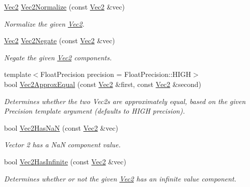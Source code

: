 \begin{DoxyCompactItemize}
\hyperlink{classgfxmath_1_1_vec2}{Vec2} \hyperlink{group___s_i_s_d_vec_math_gaa0125e18e221531bfc7d72d47cdf42d9}{Vec2\+Normalize} (const \hyperlink{classgfxmath_1_1_vec2}{Vec2} \&vec)
\begin{DoxyCompactList}\small\item\em Normalize the given \hyperlink{classgfxmath_1_1_vec2}{Vec2}. \end{DoxyCompactList}\item 
\hyperlink{classgfxmath_1_1_vec2}{Vec2} \hyperlink{group___s_i_s_d_vec_math_ga55959c707ef1b444eb2d71009a201aa2}{Vec2\+Negate} (const \hyperlink{classgfxmath_1_1_vec2}{Vec2} \&vec)
\begin{DoxyCompactList}\small\item\em Negate the given \hyperlink{classgfxmath_1_1_vec2}{Vec2} components. \end{DoxyCompactList}\item 
{\footnotesize template$<$Float\+Precision precision = Float\+Precision\+::\+H\+I\+G\+H$>$ }\\bool \hyperlink{group___s_i_s_d_vec_math_gae2e5df24e56917013fefa17579bb8749}{Vec2\+Approx\+Equal} (const \hyperlink{classgfxmath_1_1_vec2}{Vec2} \&first, const \hyperlink{classgfxmath_1_1_vec2}{Vec2} \&second)
\begin{DoxyCompactList}\small\item\em Determines whether the two Vec2s are approximately equal, based on the given Precision template argument (defaults to H\+I\+G\+H precision). \end{DoxyCompactList}\item 
bool \hyperlink{group___s_i_s_d_vec_math_ga7b340b1e4dd88d99aba27f41cd0c1d17}{Vec2\+Has\+Na\+N} (const \hyperlink{classgfxmath_1_1_vec2}{Vec2} \&vec)
\begin{DoxyCompactList}\small\item\em Vector 2 has a Na\+N component value. \end{DoxyCompactList}\item 
bool \hyperlink{group___s_i_s_d_vec_math_ga6eb96a6532361189c7cacdbd9ae95c90}{Vec2\+Has\+Infinite} (const \hyperlink{classgfxmath_1_1_vec2}{Vec2} \&vec)
\begin{DoxyCompactList}\small\item\em Determines whether or not the given \hyperlink{classgfxmath_1_1_vec2}{Vec2} has an infinite value component. \end{DoxyCompactList}\end{DoxyCompactItemize}



